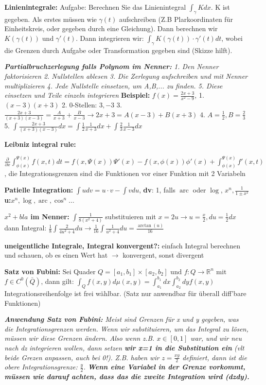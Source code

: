 \documentclass[a3paper, ngerman, 8pt]{article}
\DeclareMathOperator{\arc}{arc}
\begin{document}
\begin{multicols*}{3}
\textbf{Linienintegrale:} Aufgabe: Berechnen Sie das Linienintegral $\int_{\gamma} Kdx$. K ist gegeben. Als erstes müssen wie $\gamma (t)$ aufschreiben (Z.B Plarkoordinaten für Einheitskreis, oder gegeben durch eine Gleichung). Dann berechnen wir $K(\gamma (t))$ und $\gamma ' (t)$. Dann integrieren wir: $\int_{\gamma} K(\gamma (t))\cdot \gamma ' (t)dt$, wobei die Grenzen durch Aufgabe oder Transformation gegeben sind (Skizze hilft).

\textit{\textbf{Partialbruchzerlegung falls Polynom im Nenner:} 1. Den Nenner faktorisieren 2. Nullstellen ablesen 3. Die Zerlegung aufschreiben und mit Nenner multiplizieren 4. Jede Nullstelle einsetzen, um A,B,... zu finden. 5. Diese einsetzen und Teile einzeln integrieren}
\textbf{Beispiel: }$f(x)=\frac{2x+3}{x^2-9}$, 1. $(x-3)(x+3)$ 2. 0-Stellen: $3, -3$ 3. $\frac{2x+3}{(x+3)(x-3)}=\frac{A}{x+3}+ \frac{B}{x-3} \to 2x+3=A(x-3)+B(x+3)$ 4. $A=\frac{1}{2}, B=\frac{2}{3}$ 5. $\int\frac{2x+3}{(x+3)(x-3)}dx=\int\frac{1}{2}\frac{1}{x+3}dx+ \int\frac{2}{3}\frac{1}{x-3}dx$

\textbf{Leibniz integral rule:} 

$\frac{\partial}{\partial x}\int_{\phi (x)}^{\Psi (x)}f(x,t)dt= f(x, \Psi(x))\Psi'(x)-f(x, \phi (x))\phi'(x)+\int_{\phi (x)}^{\Psi(x)}f'(x, t)$, die Integrationsgrenzen sind die Funktionen vor einer Funktion mit 2 Variabeln

\textbf{Patielle Integration:} $\int u dv=u\cdot v -\int v du$, \textbf{dv}: 1,
falls $\arc$ oder $\log$, $x^n, \frac{1}{1\pm x^2}$
\textbf{u:}$x^n, \log, \arc, \cos^n... $

\textbf{$x^2 + bla$ im Nenner:} $\int \frac{1}{8(x^2+4)}$ substituieren mit
$x=2u \to u=\frac{x}{2}, du = \frac{1}{2}dx$ dann Integral: $\frac{1}{8}\int
\frac{2}{4u^2+4}du \to \frac{1}{16} \int \frac{1}{u^2+4}du= \frac{\arctan(u)}{16}$

\textbf{uneigentliche Integrale, Integral konvergent?:} einfach Integral berechnen und schauen, ob es einen Wert hat $\to$ konvergent, sonst divergent

\textbf{Satz von Fubini:} Sei Quader $Q=[a_1, b_1]\times[a_2, b_2]$ und $f: Q \to \mathbb{R}^n$ mit $f \in C^0(\bar{Q})$, dann gilt: $\int_Q f(x,y)d\mu (x, y)= \int_{a_1}^{b_1}dx\int_{a_2}^{b_2}dy f(x,y)$ Integrationsreihenfolge ist frei wählbar. (Satz nur anwendbar für überall diff'bare Funktionen)

\textit{\textbf{Anwendung Satz von Fubini:} Meist sind Grenzen für x und y gegeben, was die Integrationsgrenzen werden. Wenn wir substituieren, um das Integral zu lösen, müssen wir diese Grenzen ändern. Also wenn z.B. $x\in [0,1]$ war, und wir neu nach dz integrieren wollen, dann setzen \textbf{wir x=1 in die Substitution ein} (vlt beide Grezen anpassen, auch bei 0!). Z.B. haben wir $z=\frac{xy}{2}$ definiert, dann ist die obere Integrationsgrenze: $\frac{y}{2}$. \textbf{Wenn eine Variabel in der Grenze vorkommt, müssen wie darauf achten, dass das die zweite Integration wird (dzdy). }}


\end{multicols*}
\end{document}
